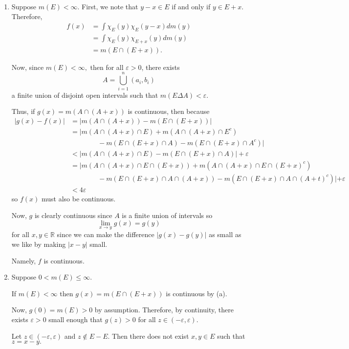 \documentclass[12pt]{Qual}
\begin{document}
\begin{solution}$\,$
 \begin{enumerate}[label=(\alph*)]
    \item Suppose $m(E)<\infty$. First, we note that $y-x\in E$ if and only if $y\in E+x$. Therefore, \begin{align*}
        f(x)&=\int\chi_E(y)\chi_E(y-x)dm(y)\\
        &=\int\chi_E(y)\chi_{E+x}(y)dm(y)\\
        &=m(E\cap (E+x)).
    \end{align*}

    Now, since $m(E)<\infty,$ then for all $\varepsilon>0$, there exists $$A=\bigcup_{i=1}^n(a_i,b_i)$$ a finite union of disjoint open intervals such that $m(E\Delta A)<\varepsilon.$

    Thus, if $g(x)=m(A\cap(A+x))$ is continuous, then because \begin{align*}
        |g(x)-f(x)|&=|m(A\cap(A+x))-m(E\cap (E+x))|\\
        &=|m(A\cap(A+x)\cap E)+m(A\cap(A+x)\cap E^c)\\
        &\qquad\qquad-m(E\cap(E+x)\cap A)-m(E\cap(E+x)\cap A^c)|\\
        &<|m(A\cap(A+x)\cap E)-m(E\cap(E+x)\cap A)|+\varepsilon\\
        &=|m(A\cap(A+x)\cap E\cap(E+x))+m(A\cap(A+x)\cap E\cap(E+x)^c)\\
        &\qquad\qquad-m(E\cap(E+x)\cap A\cap(A+x))-m(E\cap(E+x)\cap A\cap(A+t)^c)|+\varepsilon\\
        &<4\varepsilon
    \end{align*} so $f(x)$ must also be continuous.

    Now, $g$ is clearly continuous since $A$ is a finite union of intervals so $$\lim_{x\to y}g(x)=g(y)$$ for all $x,y\in\mathbb{R}$ since we can make the difference $|g(x)-g(y)|$ as small as we like by making $|x-y|$ small.

    Namely, $f$ is continuous.
    \item Suppose $0<m(E)\le\infty$.

    If $m(E)<\infty$ then $g(x)=m(E\cap(E+x))$ is continuous by (a).

    Now, $g(0)=m(E)>0$ by assumption. Therefore, by continuity, there exists $\varepsilon>0$ small enough that $g(z)>0$ for all $z\in(-\varepsilon,\varepsilon)$.

    Let $z\in(-\varepsilon,\varepsilon)$ and $z\notin E-E$. Then there does not exist $x,y\in E$ such that $z=x-y.$


\end{enumerate}
\end{solution}
\end{document}
